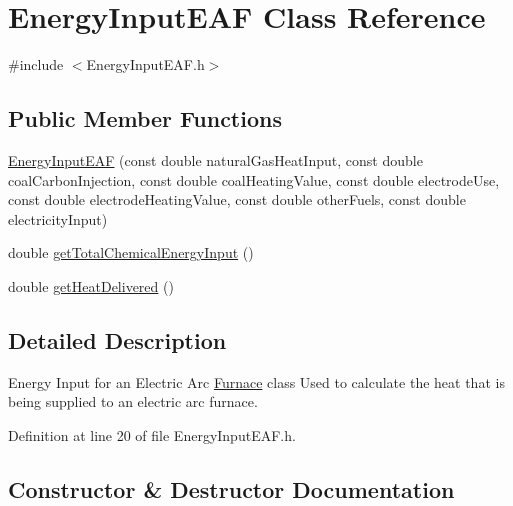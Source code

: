 \hypertarget{class_energy_input_e_a_f}{}\section{Energy\+Input\+E\+AF Class Reference}
\label{class_energy_input_e_a_f}


{\ttfamily \#include $<$Energy\+Input\+E\+A\+F.\+h$>$}

\subsection*{Public Member Functions}
\begin{DoxyCompactItemize}
\item 
\hyperlink{class_energy_input_e_a_f_a385f7047f5019124d7559cdbcb229a04}{Energy\+Input\+E\+AF} (const double natural\+Gas\+Heat\+Input, const double coal\+Carbon\+Injection, const double coal\+Heating\+Value, const double electrode\+Use, const double electrode\+Heating\+Value, const double other\+Fuels, const double electricity\+Input)
\item 
double \hyperlink{class_energy_input_e_a_f_a44b4a70dcc3e5f0bf9d33eabd6158b2f}{get\+Total\+Chemical\+Energy\+Input} ()
\item 
double \hyperlink{class_energy_input_e_a_f_ad1916eba02c6036a603cf34420169911}{get\+Heat\+Delivered} ()
\end{DoxyCompactItemize}


\subsection{Detailed Description}
Energy Input for an Electric Arc \hyperlink{class_furnace}{Furnace} class Used to calculate the heat that is being supplied to an electric arc furnace. 

Definition at line 20 of file Energy\+Input\+E\+A\+F.\+h.



\subsection{Constructor \& Destructor Documentation}
\mbox{\label{class_energy_input_e_a_f_a385f7047f5019124d7559cdbcb229a04}} 
